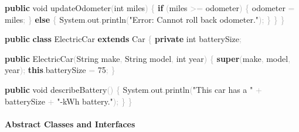 \documentclass[
  justified,
  openright,
]{tufte-book}
\let\subsection\paragraph
\let\paragraph\paragraph
\newcommand{\KeywordTok}[1]{\textcolor{CodeKeyword}{\textbf{#1}}}  %
\newcommand{\StringTok}[1]{\textcolor{CodeString}{#1}}              %
\newcommand{\CodeNumTok}[1]{\textcolor{CodeNumber}{#1}}             %
\newcommand{\CodeFuncTok}[1]{\textcolor{CodeKeyword}{#1}}           %
\newcommand{\CodeTypeTok}[1]{\textcolor{CodeType}{#1}}              %
\newcommand{\OperatorTok}[1]{\textcolor{DarkGray}{#1}}              %
\newenvironment{Shaded}{%
  \begin{mdframed}[style=TufteCode]%
}{%
  \end{mdframed}%
}
\let\subsection\paragraph
\let\paragraph\paragraph
\begin{document}
\begin{Shaded}
\begin{Highlighting}[]
    \KeywordTok{public} \CodeTypeTok{void} \CodeFuncTok{updateOdometer}\OperatorTok{(}\CodeTypeTok{int} miles\OperatorTok{)} \OperatorTok{\{}
        \KeywordTok{if} \OperatorTok{(}miles \OperatorTok{\textgreater{}=} odometer\OperatorTok{)} \OperatorTok{\{}
            odometer \OperatorTok{=} miles\OperatorTok{;}
        \OperatorTok{\}} \KeywordTok{else} \OperatorTok{\{}
            System\OperatorTok{.}\CodeFuncTok{out}\OperatorTok{.}\CodeFuncTok{println}\OperatorTok{(}\StringTok{"Error: Cannot roll back odometer."}\OperatorTok{);}
        \OperatorTok{\}}
    \OperatorTok{\}}
\OperatorTok{\}}
 
\KeywordTok{public} \KeywordTok{class} ElectricCar \KeywordTok{extends} Car \OperatorTok{\{}
    \KeywordTok{private} \CodeTypeTok{int} batterySize\OperatorTok{;}
 
    \KeywordTok{public} \CodeFuncTok{ElectricCar}\OperatorTok{(}String make\OperatorTok{,} String model\OperatorTok{,} \CodeTypeTok{int} year\OperatorTok{)} \OperatorTok{\{}
        \KeywordTok{super}\OperatorTok{(}make\OperatorTok{,} model\OperatorTok{,} year\OperatorTok{);}
        \KeywordTok{this}\OperatorTok{.}\CodeFuncTok{batterySize} \OperatorTok{=} \CodeNumTok{75}\OperatorTok{;}
    \OperatorTok{\}}
 
    \KeywordTok{public} \CodeTypeTok{void} \CodeFuncTok{describeBattery}\OperatorTok{()} \OperatorTok{\{}
        System\OperatorTok{.}\CodeFuncTok{out}\OperatorTok{.}\CodeFuncTok{println}\OperatorTok{(}\StringTok{"This car has a "} \OperatorTok{+} batterySize \OperatorTok{+} \StringTok{"{-}kWh battery."}\OperatorTok{);}
    \OperatorTok{\}}
\OperatorTok{\}}
\end{Highlighting}
\end{Shaded}

\subsection{Abstract Classes and
Interfaces}\label{abstract-classes-and-interfaces}
\end{document}
